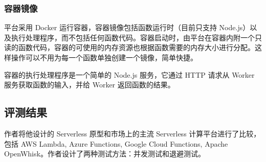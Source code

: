 \documentclass[11pt]{article}
\begin{document}
\subsubsection{容器镜像}
平台采用 Docker 运行容器，容器镜像包括函数运行时（目前只支持 Node.js）以及执行处理程序，而不包括任何函数代码。容器启动时，由平台在容器内附一个只读的函数代码，容器的可使用的内存资源也根据函数需要的内存大小进行分配。这样操作可以不用为每一个函数单独创建一个镜像，简单快捷。


容器的执行处理程序是一个简单的 Node.js 服务，它通过 HTTP 请求从 Worker 服务获取函数的输入，并给 Worker 返回函数的结果。

\subsection{评测结果}
作者将他设计的 Serverless 原型和市场上的主流 Serverless 计算平台进行了比较，包括 AWS Lambda, Azure Functions, Google Cloud Functions, Apache OpenWhisk。作者设计了两种测试方法：并发测试和退避测试。
\end{document}
